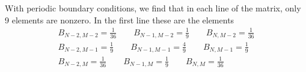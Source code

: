 \documentclass[12pt]{report}
\begin{document}
With periodic boundary conditions, we find that in each line of the
matrix, only 9 elements are nonzero. In the first line these are the
elements
\begin{eqnarray*}
  B_{N-2,M-2}=\frac{1}{36}\qquad
  B_{N-1,M-2}=\frac{1}{9}\qquad
  B_{N,M-2} =\frac{1}{36}\\
  B_{N-2,M-1}=\frac{1}{9}\qquad
  B_{N-1,M-1}=\frac{4}{9}\qquad
  B_{N,M-1} =\frac{1}{9}\\
  B_{N-2,M}=\frac{1}{36}\qquad
  B_{N-1,M}=\frac{1}{9}\qquad
  B_{N,M} =\frac{1}{36}
\end{eqnarray*}
\end{document}

